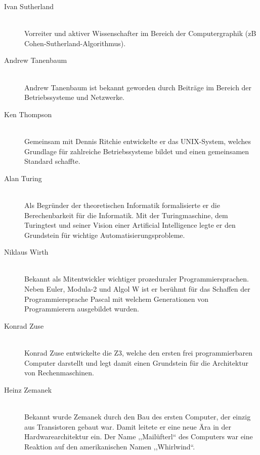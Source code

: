 \begin{description}
  \item[Ivan Sutherland ] \hfill{} \\
    Vorreiter und aktiver Wissenschafter im Bereich der Computergraphik (zB Cohen-Sutherland-Algorithmus).

  \item[Andrew Tanenbaum ] \hfill{} \\
    Andrew Tanenbaum ist bekannt geworden durch Beiträge im Bereich der Betriebssysteme und Netzwerke.

  \item[Ken Thompson ] \hfill{} \\
    Gemeinsam mit Dennis Ritchie entwickelte er das UNIX-System, welches Grundlage für zahlreiche Betriebssysteme bildet und einen gemeinsamen Standard schaffte.

  \item[Alan Turing ] \hfill{} \\
    Als Begründer der theoretischen Informatik formalisierte er die Berechenbarkeit für die Informatik. Mit der Turingmaschine, dem Turingtest und seiner Vision einer Artificial Intelligence legte er den Grundstein für wichtige Automatisierungsprobleme.

  \item[Niklaus Wirth ] \hfill{} \\
    Bekannt als Mitentwickler wichtiger prozeduraler Programmiersprachen. Neben Euler, Modula-2 und Algol W ist er berühmt für das Schaffen der Programmiersprache Pascal mit welchem Generationen von Programmierern ausgebildet wurden.

  \item[Konrad Zuse ] \hfill{} \\
    Konrad Zuse entwickelte die Z3, welche den ersten frei programmierbaren Computer darstellt und legt damit einen Grundstein für die Architektur von Rechenmaschinen.

  \item[Heinz Zemanek ] \hfill{} \\
    Bekannt wurde Zemanek durch den Bau des ersten Computer, der einzig aus Transistoren gebaut war. Damit leitete er eine neue Ära in der Hardwarearchitektur ein. Der Name ,,Mailüfterl`` des Computers war eine Reaktion auf den amerikanischen Namen ,,Whirlwind``.
\end{description}

